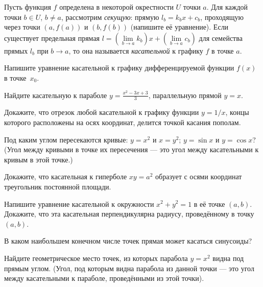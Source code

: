 \documentclass[a4paper, 12pt]{article}
\begin{document}






Пусть функция $f$ определена в некоторой окрестности $U$ точки $a$.
Для каждой точки $b\in U$, $b\ne a$, рассмотрим {\em секущую}: прямую $l_b=k_b x +c_b$, проходящую
через точки $(a,f(a))$ и $(b,f(b))$ (напишите её уравнение).
Если существует предельная прямая $l=(\lim\limits_{b\to a} k_b)x + (\lim\limits_{b\to a} c_b)$ для семейства прямых $l_b$
при $b\to a$, то она называется {\em касательной} к графику $f$ в точке $a$. %

Напишите уравнение касательной к графику дифференцируемой функции $f(x)$ в точке~$x_0$.

Найдите касательную к параболе $y=\frac{x^2-3x+3}3$, параллельную прямой
$y=x$.

Докажите, что отрезок любой касательной к графику функции $y=1/x$,
концы которого расположены на осях координат, делится точкой касания
пополам.


Под каким углом пересекаются кривые:
$y=x^2$ и $x=y^2$;
$y=\sin x$ и $y=\cos x$?\\
(Угол между кривыми в точке их пересечения --- это угол между касательными к кривым в этой точке.)

Докажите, что касательная к гиперболе $xy=a^2$ образует с осями координат
треугольник постоянной площади.

  Напишите уравнение касательной к окружности $x^2+y^2=1$ в её точке $(a,b)$.\\
 Докажите, что эта касательная перпендикулярна радиусу, проведённому в точку $(a,b)$.

В каком наибольшем конечном числе точек прямая может касаться синусоиды?



Найдите геометрическое место точек, из которых парабола $y=x^2$
видна под прямым углом. (Угол, под которым видна парабола из данной точки --- это угол между касательными к параболе, проведёнными из этой точки).
\end{document}
